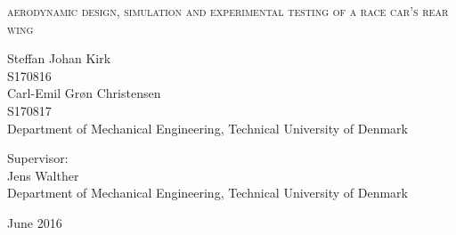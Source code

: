 
\begin{titlingpage}

\begin{center}

\vspace*{0cm}
\HUGE
\textsc{aerodynamic design, simulation and experimental testing of a race car's rear wing}\\
\vspace{1.5cm}

%
\vspace{1.2cm}

\large
{   Steffan Johan Kirk\\
    S170816\\
    Carl-Emil Grøn Christensen\\
    S170817\\
    Department of Mechanical Engineering, Technical University of Denmark
}

\vspace{1.5cm}

{
  Supervisor:\\
  Jens Walther\\
  Department of Mechanical Engineering, Technical University of Denmark
}

\vspace{1.5cm}
{June 2016}\\


\end{center}



\end{titlingpage}
